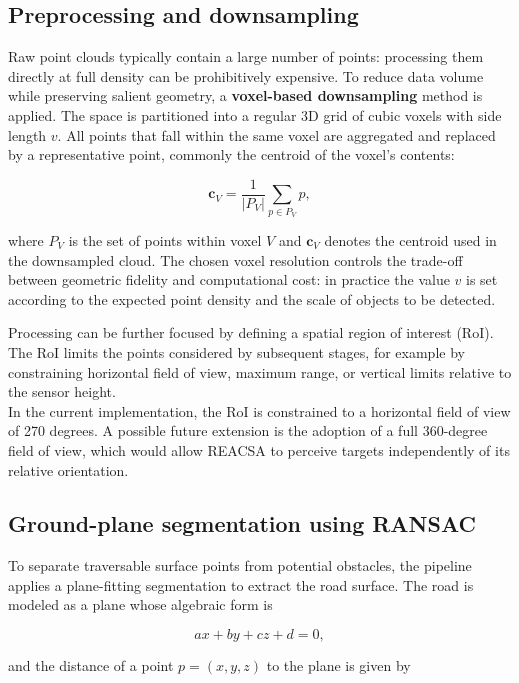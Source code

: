 \subsection{Preprocessing and downsampling}

Raw point clouds typically contain a large number of points: processing them directly at full density can be prohibitively expensive. 
To reduce data volume while preserving salient geometry, a \textbf{voxel-based downsampling} method is applied. 
The space is partitioned into a regular 3D grid of cubic voxels with side length \(v\). All points that fall within the same voxel are aggregated and replaced by a representative point, commonly the centroid of the voxel's contents:

$$
\mathbf{c}_V = \frac{1}{|P_V|} \sum_{p\in P_V} p,
$$

\noindent where \(P_V\) is the set of points within voxel \(V\) and \(\mathbf{c}_V\) denotes the centroid used in the downsampled cloud.
The chosen voxel resolution controls the trade-off between geometric fidelity and computational cost: in practice the value \(v\) is set according to the expected
point density and the scale of objects to be detected.

\medskip

\noindent Processing can be further focused by defining a spatial region of interest (RoI). The RoI limits the points considered by subsequent stages, 
for example by constraining horizontal field of view, maximum range, or vertical limits relative to the sensor height.  \\
In the current implementation, the RoI is constrained to a horizontal field of view of 270 degrees. 
A possible future extension is the adoption of a full 360-degree field of view, which would allow REACSA to perceive targets independently of its relative orientation.

\subsection{Ground-plane segmentation using RANSAC}

To separate traversable surface points from potential obstacles, the pipeline applies a plane-fitting segmentation to extract the road surface. 
The road is modeled as a plane whose algebraic form is

$$
ax + by + cz + d = 0,
$$

and the distance of a point \(p=(x,y,z)\) to the plane is given by

